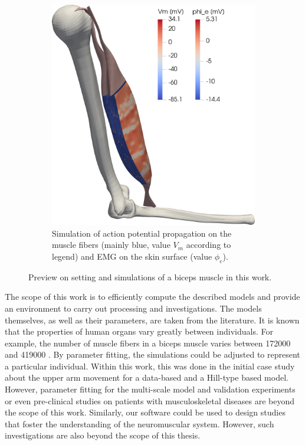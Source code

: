 \begin{figure}[H]
\begin{subfigure}[t]{0.495\textwidth}
    \includegraphics[width=\textwidth]{images/introduction/full_muscle_emg.png}%
  \caption{Simulation of action potential propagation on the muscle fibers (mainly blue, value $V_m$ according to legend) and EMG on the skin surface (value $\phi_e$).}%
    \label{fig:full_muscle_emg}%
  \end{subfigure}   
  \caption{Preview on setting and simulations of a biceps muscle in this work.}%
  \label{fig:partitioning_and_full_muscle_emg}%
\end{figure}%

The scope of this work is to efficiently compute the described models and provide an environment to carry out processing and investigations. The models themselves, as well as their parameters, are taken from the literature. It is known that the properties of human organs vary greatly between individuals. For example, the number of muscle fibers in a biceps muscle varies between \num{172000} and \num{419000} \cite{MacDougall1984}.
By parameter fitting, the simulations could be adjusted to represent a particular individual. Within this work, this was done in the initial case study about the upper arm movement for a data-based and a Hill-type based model. However, parameter fitting for the multi-scale model and validation experiments or even pre-clinical studies on patients with musculoskeletal diseases are beyond the scope of this work. Similarly, our software could be used to design studies that foster the understanding of the neuromuscular system. However, such investigations are also beyond the scope of this thesis.

